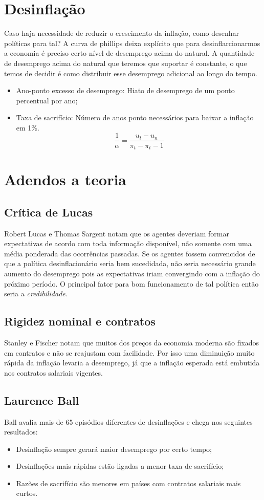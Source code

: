 \documentclass[12pt,a4paper,oneside,brazil]{abntex2}
\begin{document}
\section{Desinflação}
Caso haja necessidade de reduzir o crescimento da inflação, como desenhar políticas para tal? A curva de phillips deixa explícito que para desinflarcionarmos a economia é preciso certo nível de desemprego acima do natural.  A quantidade de desemprego acima do natural que teremos que suportar é constante, o que temos de decidir é como distribuir esse desemprego adicional ao longo do tempo.
\begin{itemize}
\item Ano-ponto excesso de desemprego: Hiato de desemprego de um ponto percentual por ano;
\item Taxa de sacrifício: Número de anos ponto necessários para baixar a inflação em 1\%.
\[ \frac{1}{\alpha} = \frac{u_t - u_n}{\pi_t - \pi_t-1}\]
\end{itemize}

\section{Adendos a teoria}
\subsection{Crítica de Lucas}
Robert Lucas e Thomas Sargent notam que os agentes deveriam formar expectativas de acordo com toda informação disponível, não somente com uma média ponderada das ocorrências passadas. Se os agentes fossem convencidos de que a política desinflacionário seria bem sucedidada, não seria necessário grande aumento do desemprego pois as expectativas iriam convergindo com a inflação do próximo período. O principal fator para bom funcionamento de tal política então seria a \emph{credibilidade}.

\subsection{Rigidez nominal e contratos}
Stanley e Fischer notam que muitos dos preços da economia moderna são fixados em contratos e não se reajustam com facilidade. Por isso uma diminuição muito rápida da inflação levaria a desemprego, já que a inflação esperada está embutida nos contratos salariais vigentes.

\subsection{Laurence Ball}
Ball avalia mais de 65 episódios diferentes de desinflações e chega nos seguintes resultados:
\begin{itemize}
\item Desinflação sempre gerará maior desemprego por certo tempo;
\item Desinflações mais rápidas estão ligadas a menor taxa de sacrifício;
\item Razões de sacrifício são menores em países com contratos salariais mais curtos.
\end{itemize}
\end{document}
